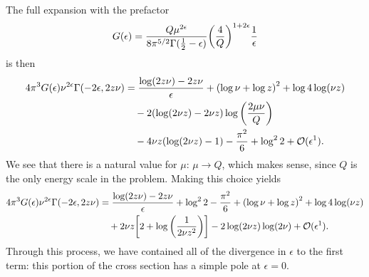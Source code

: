 \documentclass[11pt,twoside,reqno]{amsart}
\theoremstyle{plain}
\theoremstyle{remark}
\theoremstyle{definition}
\theoremstyle{remark}
\theoremstyle{definition}
\theoremstyle{definition}
\newcommand{\cO}{\mathcal{O}}
\begin{document}
	The full expansion with the prefactor
	\begin{equation}
		G(\epsilon) = \frac{Q \mu^{2\epsilon}}{8 \pi^{5/2}\Gamma(\frac{1}{2} - \epsilon)} \qty(\frac{4}{Q})^{1 + 2\epsilon} \frac{1}{\epsilon}
	\end{equation}
	is then
	\begin{equation}
	\begin{aligned}
		4\pi^3 G(\epsilon) \nu^{2\epsilon} \Gamma(-2\epsilon, 2 z \nu) &= \frac{\log(2z\nu) - 2z\nu}{\epsilon} + \qty(\log \nu + \log z)^2 + \log 4 \log (\nu  z) \\
		&\quad - 2(\log (2 \nu  z)-2 \nu z) \log\qty(\frac{2\mu \nu}{Q}) \\
		&\quad - 4 \nu  z (\log (2 \nu z)-1) - \frac{\pi ^2}{6}+\log^2 2 + \cO(\epsilon^1).
   	\end{aligned}
	\end{equation}
	We see that there is a natural value for $\mu$: $\mu \to Q$, which makes sense, since $Q$ is the only energy scale in the problem. Making this choice yields
	\begin{equation}
		\begin{aligned}
		4\pi^3 G(\epsilon) \nu^{2\epsilon} \Gamma(-2\epsilon, 2 z \nu) &= \frac{\log(2z\nu) - 2z\nu}{\epsilon} + \log^2 2 - \frac{\pi ^2}{6} + \qty(\log \nu + \log z)^2 + \log 4 \log (\nu  z) \\
		&\quad + 2 \nu z\qty[2 + \log\qty(\frac{1}{2\nu z^2})] - 2\log(2 \nu z)\log(2\nu) + \cO(\epsilon^1).
   	\end{aligned}
	\end{equation}
	Through this process, we have contained all of the divergence in $\epsilon$ to the first term: this portion of the cross section has a simple pole at $\epsilon = 0$.




\end{document}
